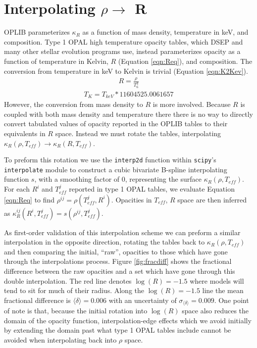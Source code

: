 \section{Interpolating $\rho \rightarrow $ R}\label{apx:interp}
OPLIB parameterizes $\kappa_{R}$ as a function of mass density, temperature in keV,
and composition. Type 1 OPAL high temperature opacity tables, which DSEP and
many other stellar evolution programs use, instead parameterizes opacity as a function
of temperature in Kelvin, $R$ (Equation \ref{eqn:Req}), and composition. The
conversion from temperature in keV to Kelvin is trivial (Equation
\ref{eqn:K2Kev}).
\begin{align}\label{eqn:Req}
	R = \frac{\rho}{T_{6}^{3}}
\end{align}
\begin{align}\label{eqn:K2Kev}
	T_{K} = T_{keV} * 11604525.0061657
\end{align}
However, the conversion from mass density to $R$ is more involved. Because $R$ is
coupled with both mass density and temperature there there is no way to
directly convert tabulated values of opacity reported in the OPLIB tables to
their equivalents in $R$ space. Instead we must rotate the tables,
interpolating $\kappa_{R}(\rho,T_{eff}) \rightarrow \kappa_{R}(R,T_{eff})$. 


To preform this rotation we use the \texttt{interp2d} function within
\texttt{scipy}'s \texttt{interpolate} \citep{2020SciPy-NMeth} module to
construct a cubic bivariate B-spline \citep{Dierckx1981} interpolating function
$s$, with a smoothing factor of 0, representing the surface $\kappa_{R}(\rho,
T_{eff})$. For each $R^{i}$ and $T^{j}_{eff}$ reported in type 1 OPAL tables, we evaluate Equation
\ref{eqn:Req} to find $\rho^{ij} = \rho(T^{j}_{eff},R^{i})$.  Opacities in
$T_{eff}$, $R$ space are then inferred as $\kappa^{ij}_{R}(R^{i},T^{j}_{eff}) =
s(\rho^{ij}, T^{j}_{eff})$. 

As first-order validation of this interpolation scheme we can preform a similar
interpolation in the opposite direction, rotating the tables back to
$\kappa_{R}(\rho, T_{eff})$ and then comparing the initial, ``raw'', opacities
to those which have gone through the interpolations process. Figure
\ref{fig:fracdiff} shows the fractional difference between the raw opacities
and a set which have gone through this double interpolation. The red line
denotes $\log(R)=-1.5$ where models will tend to sit for much of their radius.
Along the $\log(R)=-1.5$ line the mean fractional difference is $\langle \delta
\rangle = 0.006$ with an uncertainty of $\sigma_{\langle\delta\rangle} =
0.009$. One point of note is that, because the initial rotation into $\log(R)$
space also reduces the domain of the opacity function, interpolation-edge
effects which we avoid initially by extending the domain past what type 1 OPAL
tables include cannot be avoided when interpolating back into $\rho$ space. 

